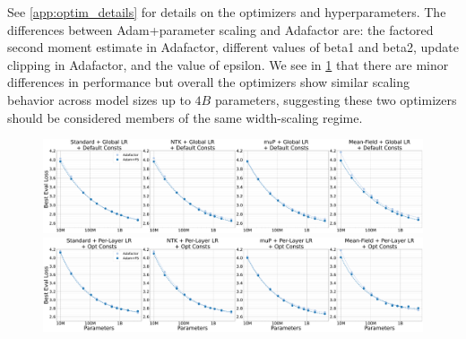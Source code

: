 \documentclass{article}
\theoremstyle{plain}
\theoremstyle{definition}
\theoremstyle{remark}
\begin{document}
See \cref{app:optim_details} for details on the optimizers and hyperparameters. The differences between Adam+parameter scaling and Adafactor are: the factored second moment estimate in Adafactor, different values of beta1 and beta2, update clipping in Adafactor, and the value of epsilon. We see in \cref{fig:adafactor_cross_check} that there are minor differences in performance but overall the optimizers show similar scaling behavior across model sizes up to $4B$ parameters, suggesting these two optimizers should be considered members of the same width-scaling regime.

\vspace{48pt}
\begin{figure}[ht]
    \begin{center}
        \includegraphics[width=\linewidth, trim={0, 0, 0, 0},clip]{icml2024/figures/adafactor_cross_check/adafactor_cross_check+50k_steps.pdf}
       
        \figvspace

        \includegraphics[width=\linewidth, trim={0, 0, 0, 0},clip]{icml2024/figures/adafactor_cross_check/adafactor_cross_check+50k_steps_per_module_lr_optimal_constants.pdf}
        \caption{}
        \label{fig:adafactor_cross_check}
    \end{center}
\end{figure}
\end{document}
